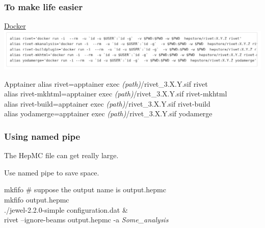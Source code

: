 \documentclass{beamer}
\begin{document}
\begin{frame}
	\frametitle{To make life easier}
	\begin{block}{\href{https://gitlab.com/hepcedar/rivet/-/blob/release-3-1-x/doc/tutorials/docker.md\#running-rivet-through-docker}{Docker}}
\includegraphics[width=\linewidth]{dockerAlias.png}
		
	\end{block}

	\begin{exampleblock}{Apptainer}
		alias rivet=\textquotesingle apptainer exec \textit{(path)}/rivet\_3.X.Y.sif rivet\textquotesingle \\
		alias rivet-mkhtml=\textquotesingle apptainer exec \textit{(path)}/rivet\_3.X.Y.sif rivet-mkhtml\textquotesingle \\
		alias rivet-build=\textquotesingle apptainer exec \textit{(path)}/rivet\_3.X.Y.sif rivet-build\textquotesingle \\
		alias yodamerge=\textquotesingle apptainer exec \textit{(path)}/rivet\_3.X.Y.sif yodamerge\textquotesingle \\
	\end{exampleblock}
\end{frame}

\begin{frame}
 \frametitle{Using named pipe}
 The HepMC file can get really large.
 
 Use named pipe to save space.
 \begin{exampleblock}{mkfifo}
 	\# suppose the output name is output.hepmc \\
 	mkfifo output.hepmc\\
 	./jewel-2.2.0-simple configuration.dat \& \\
 	rivet --ignore-beams output.hepmc -a \textit{Some\_analysis}
 \end{exampleblock}
\end{frame}


\end{document}
